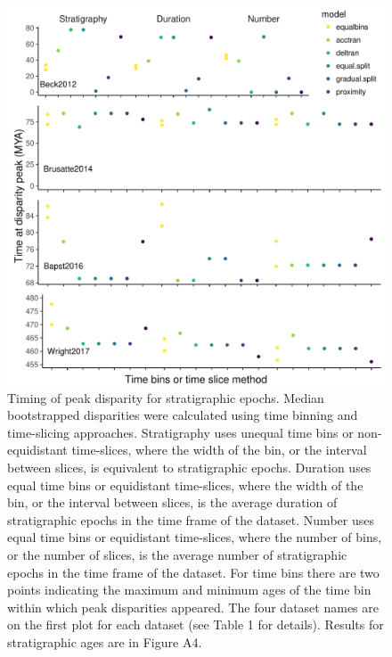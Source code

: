 \documentclass[12pt,a4paper]{article}
\begin{document}
\begin{figure}[!htbp]
    \centering
   \includegraphics[width=1\linewidth, height=1\textheight, keepaspectratio]{figures/fig-peaks-epoch-appendix-revision.pdf}
    \caption[Timing of peak disparity for four example datasets.]
    {Timing of peak disparity for stratigraphic epochs.
    Median bootstrapped disparities were calculated using time binning and time-slicing approaches. 
    Stratigraphy uses unequal time bins or non-equidistant time-slices, where the width of the bin, or the interval between slices, is equivalent to stratigraphic epochs. 
    Duration uses equal time bins or equidistant time-slices, where the width of the bin, or the interval between slices, is the average duration of stratigraphic epochs in the time frame of the dataset. 
    Number uses equal time bins or equidistant time-slices, where the number of bins, or the number of slices, is the average number of stratigraphic epochs in the time frame of the dataset. 
    For time bins there are two points indicating the maximum and minimum ages of the time bin within which peak disparities appeared.
    The four dataset names are on the first plot for each dataset (see Table 1 for details).
    Results for stratigraphic ages are in Figure A4.}
    \label{figure:peak2}
  \end{figure}
\end{document}
